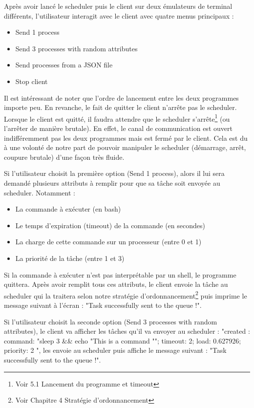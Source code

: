     Après avoir lancé le scheduler puis le client sur deux émulateurs de terminal différents, l'utilisateur interagit avec le client avec quatre menus principaux :
    
    \begin{itemize}
        \item Send 1 process
        \item Send 3 processes with random attributes
        \item Send processes from a JSON file
        \item Stop client
    \end{itemize}
    
    Il est intéressant de noter que l'ordre de lancement entre les deux programmes importe peu. En revanche, le fait de quitter le client n'arrête pas le scheduler. Lorsque le client est quitté, il faudra attendre que le scheduler s'arrête\footnote{Voir 5.1 Lancement du programme et timeout} (ou l'arrêter de manière brutale). En effet, le canal de communication est ouvert indifféremment pas les deux programmes mais est fermé par le client. Cela est du à une volonté de notre part de pouvoir manipuler le scheduler (démarrage, arrêt, coupure brutale) d'une façon très fluide. \newline
    
    Si l'utilisateur choisit la première option (Send 1 process), alors il lui sera demandé plusieurs attributs à remplir pour que sa tâche soit envoyée au scheduler. Notamment : 
    
    \begin{itemize}
        \item La commande à exécuter (en bash)
        \item Le temps d'expiration (timeout) de la commande (en secondes)
        \item La charge de cette commande sur un processeur (entre 0 et 1)
        \item La priorité de la tâche (entre 1 et 3)
    \end{itemize}
    
    Si la commande à exécuter n'est pas interprétable par un shell, le programme quittera.
    Après avoir remplit tous ces attributs, le client envoie la tâche au scheduler qui la traitera selon notre stratégie d'ordonnancement\footnote{Voir Chapitre 4 Stratégie d’ordonnancement} puis imprime le message suivant à l'écran : "Task successfully sent to the queue !". 
    
    Si l'utilisateur choisit la seconde option (Send 3 processes with random attributes), le client va afficher les tâches qu'il va envoyer au scheduler : "created : { command: "sleep 3 \&\& echo "This is a command ""; timeout: 2; load: 0.627926; priority: 2 }", les envoie au scheduler puis affiche le message suivant : "Task successfully sent to the queue !".
    
